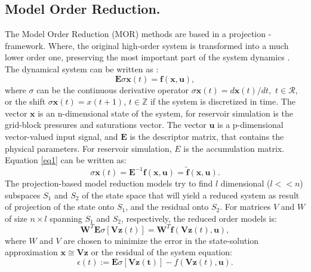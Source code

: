 \documentclass[a4paper,10pt]{report}
\begin{document}
\subsection*{Model Order Reduction.}
The Model Order Reduction (MOR) methods are based in a projection - framework. Where, the original 
high-order system is transformed into a much lower order one, 
preserving the most important part of the system dynamics \cite{Mark06,Astrid11}.\\ 
The dynamical system can be written as \cite{Mark06}:
\begin{equation}\label{eq1}
\mathbf{E}\sigma \mathbf{x}(t) = \mathbf{f}(\mathbf{x}, \mathbf{u}),
\end{equation}
where $\sigma$ can be the continuous derivative operator $\sigma \mathbf{x}(t)=d\mathbf{x}(t)/dt,$ 
$t \in \mathcal{R}$,
or the shift $\sigma \mathbf{x}(t)=x(t+1)$, $t \in \mathbb{Z}$ if the system is discretized in time. 
The vector $\mathbf{x}$ is an n-dimensional state of the system, for reservoir 
simulation is the grid-block pressures and saturations vector. The vector $\mathbf{u}$ is a p-dimensional 
vector-valued input signal, and $\mathbf{E}$ is the descriptor matrix, that contains the physical parameters.
For reservoir simulation, $E$ is the accumulation matrix. \\
Equation \eqref{eq1} can be written as:
\begin{equation}\label{eq2}
\sigma \mathbf{x}(t) =\mathbf{E}^{-1} \mathbf{f}(\mathbf{x},\mathbf{u})=\tilde{\mathbf{f}}(\mathbf{x},\mathbf{u}).
\end{equation} 
The projection-based model reduction models try to find $l$ dimensional ($l<<n$) subspaces $S_1$ and $S_2$ of 
the state space that will yield a reduced system as result of projection of the state onto $S_1$, and the residual onto $S_2$.
For matrices $V$ and $W$ of size $n \times l$ spanning $S_1$ and $S_2$, respectively, 
the reduced order models is:
\begin{equation}\label{eq3}
\mathbf{W}^T \mathbf{E}\sigma [\mathbf{V} \mathbf{z}(t)]=\mathbf{W}^T \mathbf{f}(\mathbf{V} \mathbf{z}(t),\mathbf{u}),
\end{equation} 
where $W$ and $V$ are chosen to minimize the error in the state-solution 
approximation $\mathbf{x} \cong \mathbf{V}\mathbf{z}$ or the residual of the system equation: 
\begin{equation}
\epsilon (t) := \mathbf{E}\sigma [\mathbf{V}\mathbf{z(t)}]-f(\mathbf{V}\mathbf{z}(t),\mathbf{u}).
\end{equation}
\end{document}
